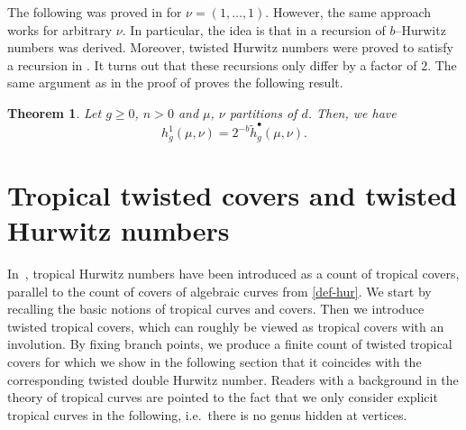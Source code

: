 \documentclass[11pt]{article}
\newtheorem{theo}{Theorem}[section]
\theoremstyle{definition}
\numberwithin{equation}{section}
\begin{document}
The following was proved in \cite[Theorem 3.2]{BF21} for $\nu=(1,\dots,1)$. However, the same approach works for arbitrary $\nu$. In particular, the idea is that in \cite[Theorem 6.5]{chapuy2020non} a recursion of $b$--Hurwitz numbers was derived. Moreover, twisted Hurwitz numbers were proved to satisfy a recursion in \cite[Theorem 2.12]{BF21}. It turns out that these recursions only differ by a factor of $2$. The same argument as in the proof of \cite[Theorem 3.2]{BF21} proves the following result.

\begin{theo}
    Let $g\ge0$, $n>0$ and $\mu$, $\nu$ partitions of $d$. Then, we have
    \begin{equation*}
        h^1_g(\mu,\nu)=2^{-b}\tilde{h}_g^{\bullet}(\mu,\nu).
    \end{equation*}
\end{theo}

\section{Tropical twisted covers and twisted Hurwitz numbers}
\label{sec:troptwist}

In~\cite{CJM10}, tropical Hurwitz numbers have been introduced as a count of tropical covers, parallel to the count of covers of algebraic curves from \cref{def-hur}. We start by recalling the basic notions of tropical curves and covers. Then we introduce twisted tropical covers, which can roughly be viewed as tropical covers with an involution. By fixing branch points, we produce a finite count of twisted tropical covers for which we show in the following section that it coincides with the corresponding twisted double Hurwitz number. Readers with a background in the theory of tropical curves are pointed to the fact that we only consider explicit tropical curves in the following, i.e.\ there is no genus hidden at vertices.
\end{document}

